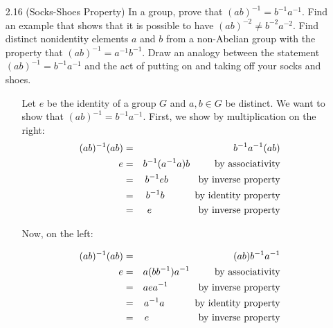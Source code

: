 \documentclass[12pt]{article}
\begin{document}
\begin{enumerate}
\item[2.16] (Socks-Shoes Property) In a group, prove that $(ab)^{-1} = b^{-1}a^{-1}$. Find
an example that shows that it is possible to have $(ab)^{-2} \neq b^{-2}a^{-2}$. Find
distinct nonidentity elements $a$ and $b$ from a non-Abelian group with the property that
$(ab)^{-1} = a^{-1}b^{-1}$. Draw an analogy between the statement $(ab)^{-1} = b^{-1}a^{-1}$
and the act of putting on and taking off your socks and shoes.
\begin{enumerate}
\item[] Let $e$ be the identity of a group $G$ and $a, b \in G$ be distinct. We want to show
that $(ab)^{-1} = b^{-1}a^{-1}$. First, we show by multiplication on the right:
\begin{eqnarray*}
(ab)^{-1}(ab) &=& b^{-1}a^{-1}(ab) \\
e &=& b^{-1}(a^{-1}a)b \hskip .9cm \mbox{by associativity} \\
&=& b^{-1}eb \hskip 1.1cm \mbox{by inverse property} \\
&=& b^{-1}b \hskip 1.1cm \mbox{by identity property} \\
&=& e \hskip 1.7cm \mbox{by inverse property}
\end{eqnarray*}

Now, on the left:

\begin{eqnarray*}
(ab)^{-1}(ab) &=& (ab)b^{-1}a^{-1} \\
e &=& a(bb^{-1})a^{-1} \hskip .9cm \mbox{by associativity} \\
&=& aea^{-1} \hskip 1.1cm \mbox{by inverse property} \\
&=& a^{-1}a \hskip 1.1cm \mbox{by identity property} \\
&=& e \hskip 1.8cm \mbox{by inverse property}
\end{eqnarray*}


\end{enumerate}
\end{enumerate}
\end{document}
